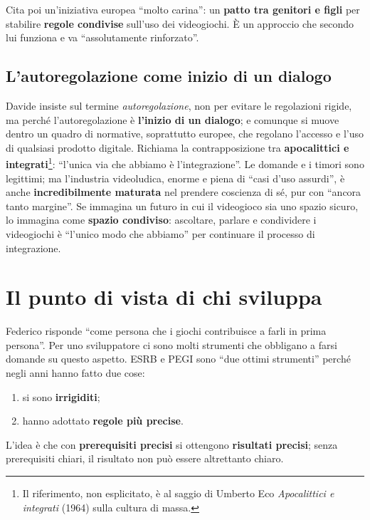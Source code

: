 Cita poi un'iniziativa europea ``molto carina'': un \textbf{patto tra genitori e
figli} per stabilire \textbf{regole condivise} sull'uso dei videogiochi. È un
approccio che secondo lui funziona e va ``assolutamente rinforzato''.

\subsection{L'autoregolazione come inizio di un dialogo}

Davide insiste sul termine \emph{autoregolazione}, non per evitare le
regolazioni rigide, ma perché l'autoregolazione è \textbf{l'inizio di un
dialogo}; e comunque si muove dentro un quadro di normative, soprattutto
europee, che regolano l'accesso e l'uso di qualsiasi prodotto digitale. Richiama
la contrapposizione tra \textbf{apocalittici e integrati}\footnote{Il
riferimento, non esplicitato, è al saggio di Umberto Eco \emph{Apocalittici e
integrati} (1964) sulla cultura di massa.}: ``l'unica via che abbiamo è
l'integrazione''. Le domande e i timori sono legittimi; ma l'industria
videoludica, enorme e piena di ``casi d'uso assurdi'', è anche
\textbf{incredibilmente maturata} nel prendere coscienza di sé, pur con ``ancora
tanto margine''. Se immagina un futuro in cui il videogioco sia uno spazio
sicuro, lo immagina come \textbf{spazio condiviso}: ascoltare, parlare e
condividere i videogiochi è ``l'unico modo che abbiamo'' per continuare il
processo di integrazione.

\section{Il punto di vista di chi sviluppa}
\label{sec:c1-1-sviluppatore}

Federico risponde ``come persona che i giochi contribuisce a farli in prima
persona''. Per uno sviluppatore ci sono molti strumenti che obbligano a farsi
domande su questo aspetto. ESRB e PEGI sono ``due ottimi strumenti'' perché negli
anni hanno fatto due cose:
\begin{enumerate}
  \item si sono \textbf{irrigiditi};
  \item hanno adottato \textbf{regole più precise}.
\end{enumerate}
L'idea è che con \textbf{prerequisiti precisi} si ottengono \textbf{risultati
precisi}; senza prerequisiti chiari, il risultato non può essere altrettanto
chiaro.

